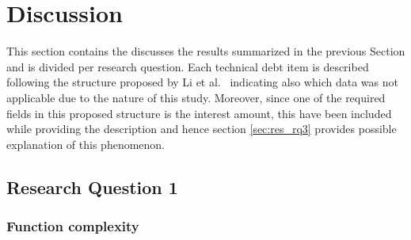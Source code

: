 \chapter{Discussion}

This section contains the discusses the results summarized in the previous Section and is divided per research question. Each technical debt item is described following the structure proposed by Li et al.\ \cite{mapping_study_td} indicating also which data was not applicable due to the nature of this study. Moreover, since one of the required fields in this proposed structure is the interest amount, this have been included while providing the description and hence section \ref{sec:res_rq3} provides possible explanation of this phenomenon.


\section{Research Question 1}

	\subsection{Function complexity}
	
